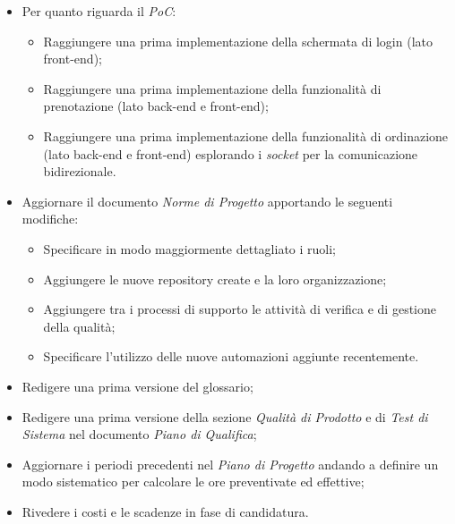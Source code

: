 \begin{itemize}
    \item Per quanto riguarda il \emph{PoC}:
    \begin{itemize}
        \item Raggiungere una prima implementazione della schermata di login (lato front-end);
        \item Raggiungere una prima implementazione della funzionalità di prenotazione (lato back-end e front-end);
        \item Raggiungere una prima implementazione della funzionalità di ordinazione (lato back-end e front-end) esplorando i \emph{socket} per la comunicazione bidirezionale.
    \end{itemize}
    \item Aggiornare il documento \emph{Norme di Progetto} apportando le seguenti modifiche:
    \begin{itemize}
        \item Specificare in modo maggiormente dettagliato i ruoli;
        \item Aggiungere le nuove repository create e la loro organizzazione;
        \item Aggiungere tra i processi di supporto le attività di verifica e di gestione della qualità;
        \item Specificare l'utilizzo delle nuove automazioni aggiunte recentemente.
    \end{itemize}
    \item Redigere una prima versione del glossario;
    \item Redigere una prima versione della sezione \emph{Qualità di Prodotto} e di \emph{Test di Sistema} nel documento \emph{Piano di Qualifica};
    \item Aggiornare i periodi precedenti nel \emph{Piano di Progetto} andando a definire un modo sistematico per calcolare le ore preventivate ed effettive;
    \item Rivedere i costi e le scadenze in fase di candidatura.
\end{itemize}
